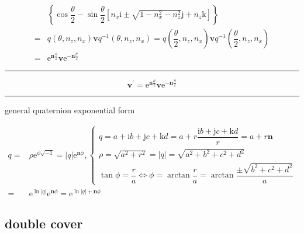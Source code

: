 \documentclass[
]{book}
\theoremstyle{definition}
\theoremstyle{definition}
\theoremstyle{definition}
\theoremstyle{definition}
\theoremstyle{remark}
\begin{document}
\[\begin{aligned}
 & \left\{ \cos\dfrac{\theta}{2}-\sin\dfrac{\theta}{2}\left[n_{{\scriptscriptstyle x}}\mathrm{i}\pm\sqrt{1-n_{{\scriptscriptstyle x}}^{2}-n_{{\scriptscriptstyle z}}^{2}}\mathrm{j}+n_{{\scriptscriptstyle z}}\mathrm{k}\right]\right\} \\
= & q\left(\theta,n_{{\scriptscriptstyle z}},n_{{\scriptscriptstyle x}}\right)\boldsymbol{v}q^{-1}\left(\theta,n_{{\scriptscriptstyle z}},n_{{\scriptscriptstyle x}}\right)=q\left(\dfrac{\theta}{2},n_{{\scriptscriptstyle z}},n_{{\scriptscriptstyle x}}\right)\boldsymbol{v}q^{-1}\left(\dfrac{\theta}{2},n_{{\scriptscriptstyle z}},n_{{\scriptscriptstyle x}}\right)\\
= & \mathrm{e}^{\boldsymbol{n}\frac{\theta}{2}}\boldsymbol{v}\mathrm{e}^{-\boldsymbol{n}\frac{\theta}{2}}
\end{aligned}
\]

\begin{center}\rule{0.5\linewidth}{0.5pt}\end{center}

\[
\boldsymbol{v}^{\prime}=\mathrm{e}^{\boldsymbol{n}\frac{\theta}{2}}\boldsymbol{v}\mathrm{e}^{-\boldsymbol{n}\frac{\theta}{2}}
\]

\begin{center}\rule{0.5\linewidth}{0.5pt}\end{center}

general quaternion exponential form

\[
\begin{aligned}
q= & \rho\mathrm{e}^{\phi\sqrt{-1}}=\left|q\right|\mathrm{e}^{\boldsymbol{n}\phi},\begin{cases}
q=a+\mathrm{i}b+\mathrm{j}c+\mathrm{k}d=a+r\dfrac{\mathrm{i}b+\mathrm{j}c+\mathrm{k}d}{r}=a+r\boldsymbol{n}\\
\rho=\sqrt{a^{2}+r^{2}}=\left|q\right|=\sqrt{a^{2}+b^{2}+c^{2}+d^{2}}\\
\tan\phi=\dfrac{r}{a}\Leftrightarrow\phi=\arctan\dfrac{r}{a}=\arctan\dfrac{\pm\sqrt{b^{2}+c^{2}+d^{2}}}{a}
\end{cases}\\
= & \mathrm{e}^{\ln\left|q\right|}\mathrm{e}^{\boldsymbol{n}\phi}=\mathrm{e}^{\ln\left|q\right|+\boldsymbol{n}\phi}
\end{aligned}
\]

\subsection{double cover}\label{double-cover}
\end{document}
